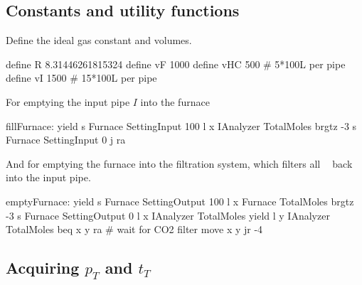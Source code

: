 \documentclass{article}
\DeclareMathOperator{\CDiox}{\mathrm{CO}_2}
\begin{document}
\subsection{Constants and utility functions}

\begin{paracol}{2}
    Define the ideal gas constant and volumes.
    \switchcolumn
    \begin{mips}
        define R 8.31446261815324
        define vF  1000
        define vHC 500  #  5*100L per pipe
        define vI  1500 # 15*100L per pipe
    \end{mips}
    \switchcolumn*
    \noindent
    For emptying the input pipe $I$ into the furnace
    \switchcolumn
    \begin{mips}
        fillFurnace:
        yield
        s Furnace SettingInput 100
        l x IAnalyzer TotalMoles
        brgtz -3
        s Furnace SettingInput 0
        j ra
    \end{mips}
    \switchcolumn*
    \noindent
    And for emptying the furnace into the filtration system,
    which filters all $\CDiox$ back into the input pipe.
    \switchcolumn
    \vspace{-1em}
    \begin{mips}
        emptyFurnace:
        yield
        s Furnace SettingOutput 100
        l x Furnace TotalMoles
        brgtz -3
        s Furnace SettingOutput 0
        l x IAnalyzer TotalMoles
        yield
        l y IAnalyzer TotalMoles
        beq x y ra # wait for CO2 filter
        move x y
        jr -4
    \end{mips}
\end{paracol}

\subsection{%
    Acquiring \texorpdfstring{$p_T$}{pT} and \texorpdfstring{$t_T$}{tT}
}
\end{document}
